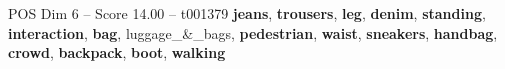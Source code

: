 \begin{textsample}{POS Dim 6 – Score 14.00 – t001379}  \label{ex:f6_pos_037}
\textbf{jeans}, \textbf{trousers}, \textbf{leg}, \textbf{denim}, \textbf{standing}, \textbf{interaction}, \textbf{bag}, luggage\_\&\_bags, \textbf{pedestrian}, \textbf{waist}, \textbf{sneakers}, \textbf{handbag}, \textbf{crowd}, \textbf{backpack}, \textbf{boot}, \textbf{walking}

\end{textsample}
